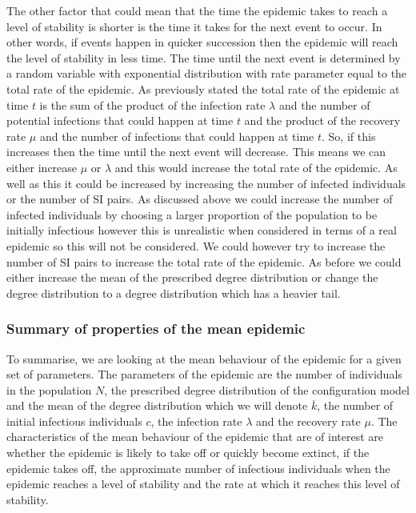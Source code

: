 \documentclass{uonmathsreport}
\begin{document}
The other factor that could mean that the time the epidemic takes to reach a level of stability is shorter is the time it takes for the next event to occur. In other words, if events happen in quicker succession then the epidemic will reach the level of stability in less time. The time until the next event is determined by a random variable with exponential distribution with rate parameter equal to the total rate of the epidemic.  As previously stated the total rate of the epidemic at time $t$ is the sum of the product of the infection rate $\lambda$ and the number of potential infections that could happen at time $t$ and the product of the recovery rate $\mu$ and the number of infections that could happen at time $t$. So, if this increases then the time until the next event will decrease. This means we can either increase $\mu$ or $\lambda$ and this would increase the total rate of the epidemic. As well as this it could be increased by increasing the number of infected individuals or the number of SI pairs. As discussed above we could increase the number of infected individuals by choosing a larger proportion of the population to be initially infectious however this is unrealistic when considered in terms of a real epidemic so this will not be considered. We could however try to increase the number of SI pairs to increase the total rate of the epidemic. As before we could either increase the mean of the prescribed degree distribution or change the degree distribution to a degree distribution which has a heavier tail.

\subsubsection{Summary of properties of the mean epidemic} \label{subsub:5.4.5}

To summarise, we are looking at the mean behaviour of the epidemic for a given set of parameters. The parameters of the epidemic are the number of individuals in the population $N$, the prescribed degree distribution of the configuration model and the mean of the degree distribution which we will denote $\overline{k}$, the number of initial infectious individuals $c$, the infection rate $\lambda$ and the recovery rate $\mu$. The characteristics of the mean behaviour of the epidemic that are of interest are whether the epidemic is likely to take off or quickly become extinct, if the epidemic takes off, the approximate number of infectious individuals when the epidemic reaches a level of stability and the rate at which it reaches this level of stability.
\end{document}
